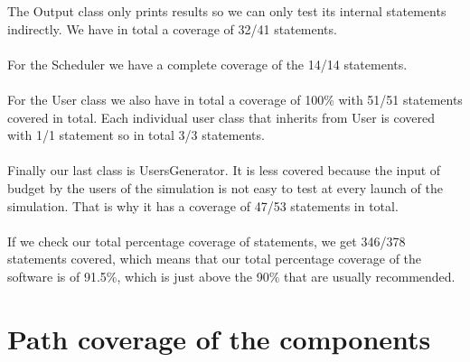 \documentclass [10 pt, a4 paper]{report}
\begin{document}
The Output class only prints results so we can only test its internal statements indirectly. We have in total a coverage of 32/41 statements.
\\ \\
For the Scheduler we have a complete coverage of the 14/14 statements.
\\ \\
For the User class we also have in total a coverage of 100\% with 51/51 statements covered in total. Each individual user class that inherits from User is covered with 1/1 statement so in total 3/3 statements.
\\ \\
Finally our last class is UsersGenerator. It is less covered because the input of budget by the users of the simulation is not easy to test at every launch of the simulation. That is why it has a coverage of 47/53 statements in total.
\\ \\
If we check our total percentage coverage of statements, we get 346/378 statements covered, which means that our total percentage coverage of the software is of 91.5\%, which is just above the 90\% that are usually recommended.


\section{Path coverage of the components}
\end{document}
